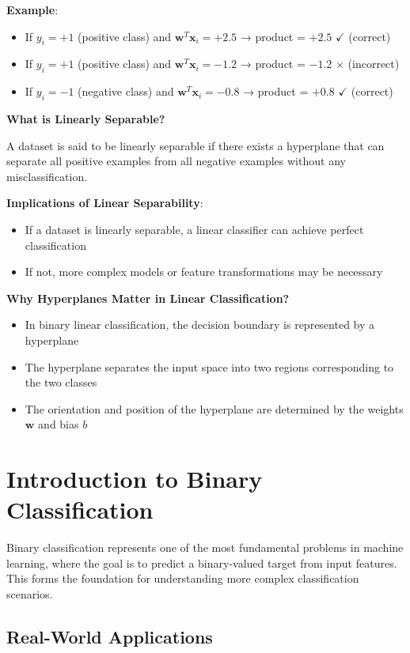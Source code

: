 \textbf{Example}: 
\begin{itemize}
    \item If $y_i = +1$ (positive class) and $\mathbf{w}^T \mathbf{x}_i = +2.5$ → product = $+2.5$ $\checkmark$ (correct)
    \item If $y_i = +1$ (positive class) and $\mathbf{w}^T \mathbf{x}_i = -1.2$ → product = $-1.2$ $\times$ (incorrect)
    \item If $y_i = -1$ (negative class) and $\mathbf{w}^T \mathbf{x}_i = -0.8$ → product = $+0.8$ $\checkmark$ (correct)
\end{itemize}


\textbf{What is Linearly Separable?}
\begin{definition}
A dataset is said to be linearly separable if there exists a hyperplane that can separate all positive examples from all negative examples without any misclassification.
\end{definition}
\textbf{Implications of Linear Separability}:
\begin{itemize}
    \item If a dataset is linearly separable, a linear classifier can achieve perfect classification
    \item If not, more complex models or feature transformations may be necessary
\end{itemize}   
\textbf{Why Hyperplanes Matter in Linear Classification?}
\begin{itemize}
    \item In binary linear classification, the decision boundary is represented by a hyperplane
    \item The hyperplane separates the input space into two regions corresponding to the two classes
    \item The orientation and position of the hyperplane are determined by the weights $\bm{w}$ and bias $b$
\end{itemize}

\section{Introduction to Binary Classification}

Binary classification represents one of the most fundamental problems in machine learning, where the goal is to predict a binary-valued target from input features. This forms the foundation for understanding more complex classification scenarios.

\subsection{Real-World Applications}

